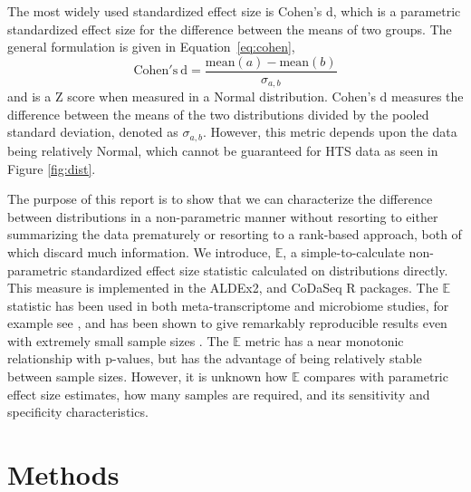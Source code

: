 \documentclass[fleqn,10pt,lineno]{wlpeerj}
\begin{document}
The most widely used standardized effect size is Cohen's d, which is a parametric standardized effect size for the difference between the means of two groups. The general formulation is given in Equation~\ref{eq:cohen},
\begin{equation}
\mathrm{Cohen's~d} = \frac{\mathrm{mean}(a)- \mathrm{mean}(b)}{\sigma_{a,b}}
\label{eq:cohen}
\end{equation}
 and is  a Z score when measured in a Normal distribution. Cohen's d measures the difference between the means of the two distributions divided by the pooled standard deviation, denoted as \(\sigma_{a,b}\). However, this metric depends upon the data being relatively Normal, which cannot be guaranteed for HTS data as seen in Figure \ref{fig:dist}. 

The purpose of this report is to show that  we  can characterize the difference between distributions in a non-parametric manner without resorting to either summarizing the data prematurely or resorting to a rank-based approach, both of which  discard much information. We introduce, $\mathbb{E}$,  a simple-to-calculate non-parametric standardized effect size statistic calculated on distributions directly. This measure is implemented in the ALDEx2, and CoDaSeq R packages.  The $\mathbb{E}$ statistic has been used in both meta-transcriptome and microbiome studies, for example see \citep{macklaim:2013, bian:2017}, and has been shown to give remarkably reproducible results even with extremely small sample sizes \citep{nelson:2015vaginal}.   The $\mathbb{E}$ metric has a near monotonic relationship with p-values, but has the advantage of being relatively stable between sample sizes. However, it is unknown how  $\mathbb{E}$  compares with parametric effect size estimates, how many samples are required, and its sensitivity and specificity characteristics. 

\section*{Methods}
\end{document}
